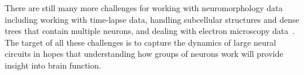 There are still many more challenges for working with
neuromorphology data including working with time-lapse data,
handling subcellular structures and dense trees that contain
multiple neurons, and dealing with electron microscopy
data~\autocite{DIADEM&Beyond:Liu:2011}. The target of all these
challenges is to capture the dynamics of large neural circuits in
hopes that understanding how groups of neurons work will provide
insight into brain function.

